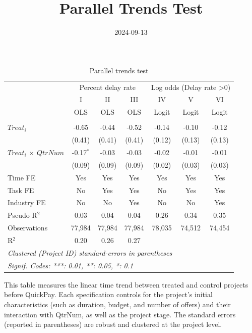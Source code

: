 \documentclass[
]{article}
\title{Parallel Trends Test}
\author{}
\date{\vspace{-2.5em}2024-09-13}
\begin{document}
\maketitle

\begin{table}[htbp]
   \caption{Parallel trends test}
   \centering
   \small
   \begin{tabular}{lcccccc}
      \toprule
       & \multicolumn{3}{c}{Percent delay rate} & \multicolumn{3}{c}{Log odds (Delay rate >0)}\\
                                   & I           & II     & III    & IV     & V      & VI\\  
                                   &  OLS        & OLS    & OLS    & Logit  & Logit  & Logit\\  
      \midrule \\
      $Treat_i$                    & -0.65       & -0.44  & -0.52  & -0.14  & -0.10  & -0.12\\   
                                   & (0.41)      & (0.41) & (0.41) & (0.12) & (0.13) & (0.13)\\   
      $Treat_i$ $\times$ $QtrNum$  & -0.17$^{*}$ & -0.03  & -0.03  & -0.02  & -0.01  & -0.01\\   
                                   & (0.09)      & (0.09) & (0.09) & (0.02) & (0.03) & (0.03)\\   
      \midrule 
      Time FE                      & Yes         & Yes    & Yes    & Yes    & Yes    & Yes\\  
      Task FE                      & No          & Yes    & Yes    & No     & Yes    & Yes\\  
      Industry FE                  & No          & No     & Yes    & No     & No     & Yes\\  
      Pseudo R$^2$                 & 0.03        & 0.04   & 0.04   & 0.26   & 0.34   & 0.35\\  
      Observations                 & 77,984      & 77,984 & 77,984 & 78,035 & 74,512 & 74,454\\  
      R$^2$                        & 0.20        & 0.26   & 0.27   &        &        & \\  
      \midrule
      \multicolumn{7}{l}{\emph{Clustered (Project ID) standard-errors in parentheses}}\\
      \multicolumn{7}{l}{\emph{Signif. Codes: ***: 0.01, **: 0.05, *: 0.1}}\\
   \end{tabular}
   
   \par \raggedright 
   This table measures the linear time trend between treated and control projects before QuickPay. Each specification controls for the project’s initial characteristics (such as duration, budget, and number of offers) and their interaction with QtrNum, as well as the project stage. The standard errors (reported in parentheses) are robust and clustered at the project level.
\end{table}
\end{document}
